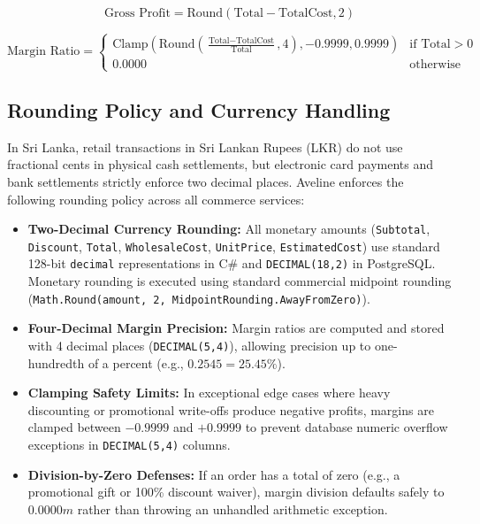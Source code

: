 \begin{equation}
\text{Gross Profit} = \text{Round}(\text{Total} - \text{TotalCost}, 2)
\end{equation}

\begin{equation}
\text{Margin Ratio} = \begin{cases} 
\text{Clamp}\left(\text{Round}\left(\frac{\text{Total} - \text{TotalCost}}{\text{Total}}, 4\right), -0.9999, 0.9999\right) & \text{if } \text{Total} > 0 \\ 
0.0000 & \text{otherwise} 
\end{cases}
\end{equation}

\subsection{Rounding Policy and Currency Handling}

In Sri Lanka, retail transactions in Sri Lankan Rupees (LKR) do not use fractional cents in physical cash settlements, but electronic card payments and bank settlements strictly enforce two decimal places. Aveline enforces the following rounding policy across all commerce services:

\begin{itemize}
    \item \textbf{Two-Decimal Currency Rounding:} All monetary amounts (\texttt{Subtotal}, \texttt{Discount}, \texttt{Total}, \texttt{WholesaleCost}, \texttt{UnitPrice}, \texttt{EstimatedCost}) use standard 128-bit \texttt{decimal} representations in C\# and \texttt{DECIMAL(18,2)} in PostgreSQL. Monetary rounding is executed using standard commercial midpoint rounding (\texttt{Math.Round(amount, 2, MidpointRounding.AwayFromZero)}).
    \item \textbf{Four-Decimal Margin Precision:} Margin ratios are computed and stored with 4 decimal places (\texttt{DECIMAL(5,4)}), allowing precision up to one-hundredth of a percent (e.g., $0.2545 = 25.45\%$).
    \item \textbf{Clamping Safety Limits:} In exceptional edge cases where heavy discounting or promotional write-offs produce negative profits, margins are clamped between $-0.9999$ and $+0.9999$ to prevent database numeric overflow exceptions in \texttt{DECIMAL(5,4)} columns.
    \item \textbf{Division-by-Zero Defenses:} If an order has a total of zero (e.g., a promotional gift or 100\% discount waiver), margin division defaults safely to $0.0000m$ rather than throwing an unhandled arithmetic exception.
\end{itemize}

